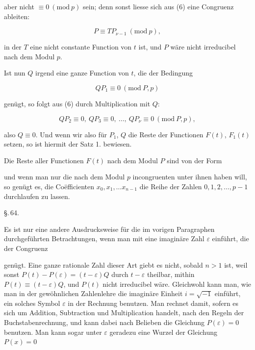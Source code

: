 aber nicht $\equiv 0\ (\mathrm{mod}\ p)$ sein; denn sonst liesse sich aus (6) eine Congruenz ableiten:

\[
P \equiv T P_{\nu-1}\ (\mathrm{mod}\ p),
\]

in der $T$ eine nicht constante Function von $t$ ist, und $P$ wäre nicht irreducibel nach dem Modul $p$.

Ist nun $Q$ irgend eine ganze Function von $t$, die der Bedingung

\[
Q P_1 \equiv 0\ (\mathrm{mod}\ P, p)
\]

genügt, so folgt aus (6) durch Multiplication mit $Q$:

\[
Q P_2 \equiv 0,\ Q P_3 \equiv 0,\ \ldots,\ Q P_\nu \equiv 0\ (\mathrm{mod}\ P, p),
\]

also $Q \equiv 0$. Und wenn wir also für $P_1$, $Q$ die Reste der Functionen $F(t)$, $F_1(t)$ setzen, so ist hiermit der Satz 1. bewiesen.

Die Reste aller Functionen $F(t)$ nach dem Modul $P$ sind von der Form


und wenn man nur die nach dem Modul $p$ incongruenten unter ihnen haben will, so genügt es, die Co\"efficienten $x_0, x_1, \ldots x_{n-1}$ die Reihe der Zahlen $0, 1, 2, \ldots, p-1$ durchlaufen zu lassen.


\S.\,64.


Es ist nur eine andere Ausdrucksweise für die im vorigen Paragraphen durchgeführten Betrachtungen, wenn man mit  eine imaginäre Zahl $\varepsilon$ einführt, die der Congruenz


genügt. Eine ganze rationale Zahl dieser Art giebt es nicht, sobald $n > 1$ ist, weil sonst $P(t) - P(\varepsilon) = (t-\varepsilon)Q$ durch $t-\varepsilon$ theilbar, mithin $P(t) \equiv (t-\varepsilon)Q$, und $P(t)$ nicht irreducibel wäre. Gleichwohl kann man, wie man in der gewöhnlichen Zahlenlehre die imaginäre Einheit $i = \sqrt{-1}$ einführt, ein solches Symbol $\varepsilon$ in der Rechnung benutzen. Man rechnet damit, sofern es sich um Addition, Subtraction und Multiplication handelt, nach den Regeln der Buchstabenrechnung, und kann dabei nach Belieben die Gleichung $P(\varepsilon) = 0$ benutzen. Man kann sogar unter $\varepsilon$ geradezu eine Wurzel der Gleichung $P(x) = 0$
